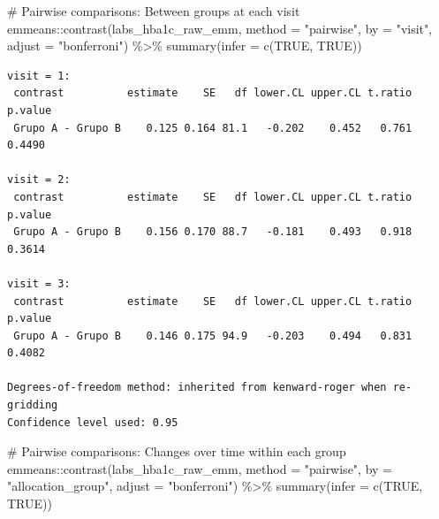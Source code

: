 \documentclass[
  letterpaper,
  DIV=11,
  numbers=noendperiod]{scrartcl}
\newenvironment{Shaded}{\begin{snugshade}}{\end{snugshade}}
\newcommand{\AttributeTok}[1]{\textcolor[rgb]{0.40,0.45,0.13}{#1}}
\newcommand{\CommentTok}[1]{\textcolor[rgb]{0.37,0.37,0.37}{#1}}
\newcommand{\ConstantTok}[1]{\textcolor[rgb]{0.56,0.35,0.01}{#1}}
\newcommand{\FunctionTok}[1]{\textcolor[rgb]{0.28,0.35,0.67}{#1}}
\newcommand{\NormalTok}[1]{\textcolor[rgb]{0.00,0.23,0.31}{#1}}
\newcommand{\SpecialCharTok}[1]{\textcolor[rgb]{0.37,0.37,0.37}{#1}}
\newcommand{\StringTok}[1]{\textcolor[rgb]{0.13,0.47,0.30}{#1}}
\begin{document}
\begin{Shaded}
\begin{Highlighting}[]
\CommentTok{\# Pairwise comparisons: Between groups at each visit}
\NormalTok{emmeans}\SpecialCharTok{::}\FunctionTok{contrast}\NormalTok{(labs\_hba1c\_raw\_emm, }\AttributeTok{method =} \StringTok{"pairwise"}\NormalTok{, }\AttributeTok{by =} \StringTok{"visit"}\NormalTok{, }\AttributeTok{adjust =} \StringTok{"bonferroni"}\NormalTok{) }\SpecialCharTok{\%\textgreater{}\%} \FunctionTok{summary}\NormalTok{(}\AttributeTok{infer =} \FunctionTok{c}\NormalTok{(}\ConstantTok{TRUE}\NormalTok{, }\ConstantTok{TRUE}\NormalTok{))}
\end{Highlighting}
\end{Shaded}

\begin{verbatim}
visit = 1:
 contrast          estimate    SE   df lower.CL upper.CL t.ratio p.value
 Grupo A - Grupo B    0.125 0.164 81.1   -0.202    0.452   0.761  0.4490

visit = 2:
 contrast          estimate    SE   df lower.CL upper.CL t.ratio p.value
 Grupo A - Grupo B    0.156 0.170 88.7   -0.181    0.493   0.918  0.3614

visit = 3:
 contrast          estimate    SE   df lower.CL upper.CL t.ratio p.value
 Grupo A - Grupo B    0.146 0.175 94.9   -0.203    0.494   0.831  0.4082

Degrees-of-freedom method: inherited from kenward-roger when re-gridding 
Confidence level used: 0.95 
\end{verbatim}

\begin{Shaded}
\begin{Highlighting}[]
\CommentTok{\# Pairwise comparisons: Changes over time within each group}
\NormalTok{emmeans}\SpecialCharTok{::}\FunctionTok{contrast}\NormalTok{(labs\_hba1c\_raw\_emm, }\AttributeTok{method =} \StringTok{"pairwise"}\NormalTok{, }\AttributeTok{by =} \StringTok{"allocation\_group"}\NormalTok{, }\AttributeTok{adjust =} \StringTok{"bonferroni"}\NormalTok{) }\SpecialCharTok{\%\textgreater{}\%} \FunctionTok{summary}\NormalTok{(}\AttributeTok{infer =} \FunctionTok{c}\NormalTok{(}\ConstantTok{TRUE}\NormalTok{, }\ConstantTok{TRUE}\NormalTok{))}
\end{Highlighting}
\end{Shaded}
\end{document}
